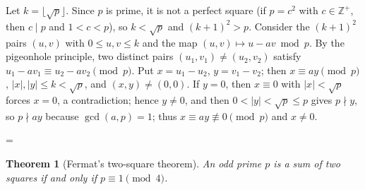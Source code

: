 \documentclass[11pt]{article}
\makeatletter
\theoremstyle{ntstyle}
\newtheorem{theorem}{Theorem}[subsection]
\let\nt@closedisplay\]
\def\nt@guardedclose{\@ifnextchar\par{\nt@closeafterpar}{\@ifnextchar\end{\postdisplaypenalty\@M\nt@closedisplay}{\nt@closedisplay}}}
\def\nt@closeafterpar\par{\@ifnextchar\par{\nt@closeafterpar}{\@ifnextchar\end{\postdisplaypenalty\@M\nt@closedisplay\par}{\nt@closedisplay\par}}}
\renewenvironment{proof}[1][\proofname]{\par
  \pushQED{\qed}\normalfont\topsep\medskipamount\edef\nt@afterproof{\@endparpenalty=\the\@endparpenalty\relax}\@beginparpenalty\@M\@endparpenalty\@M\let\]\nt@guardedclose\trivlist\item[]\textit{#1\@addpunct{.}} \ignorespaces}{\ifvmode\addpenalty\@M\fi\popQED\nt@afterproof\endtrivlist\@endpefalse}
\makeatother
\begin{document}
\begin{proof} Let $k = \lfloor \sqrt{p} \rfloor$. Since $p$ is
	prime, it is not a perfect square (if $p = c^{2}$ with $c \in \mathbb{Z}^+$,
	then $c \mid p$ and $1 < c < p$), so $k < \sqrt{p}$ and $(k+1)^2 > p$. Consider the $(k+1)^2$ pairs $(u, v)$
	with $0 \le u, v \le k$ and the map $(u, v) \mapsto u - a v \bmod p$.
	By the pigeonhole principle, two distinct pairs $(u_1, v_1) \neq (u_2, v_2)$ satisfy
	$u_1 - a v_1 \equiv u_2 - a v_2 \pmod{p}$. Put $x = u_1 - u_2$, $y =
		v_1 - v_2$; then $x \equiv a y \pmod{p}$, $|x|, |y| \le k < \sqrt{p}$,
	and $(x,y) \neq (0,0)$. If $y = 0$, then $x \equiv 0$ with $|x| < \sqrt{p}$
	forces $x = 0$, a contradiction; hence $y \neq 0$, and then $0 < |y| < \sqrt{p} \le p$ gives $p \nmid y$, so
	$p \nmid ay$ because $\gcd(a, p) = 1$; thus $x \equiv ay \not\equiv 0
		\pmod{p}$ and $x \neq 0$.

\end{proof}
\begin{theorem}[Fermat's two-square theorem]\label{thm:8.1.2} An
	odd prime $p$ is a sum of two squares if and only if $p \equiv 1 \pmod{4}$.

\end{theorem}
\end{document}
